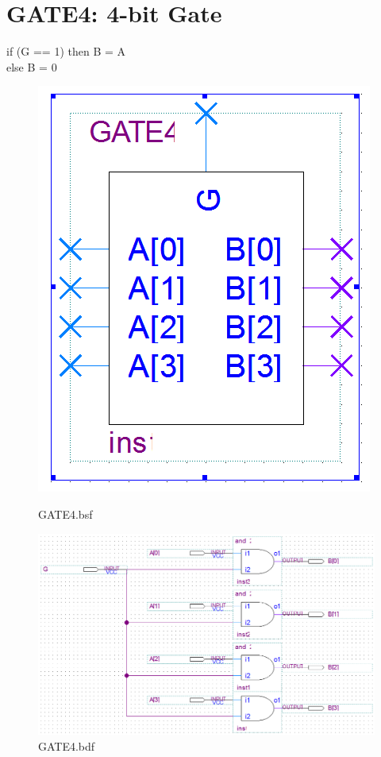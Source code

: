 \documentclass[12pt,a4paper]{article}
\begin{document}
  \section{GATE4: 4-bit Gate}
  if (G == 1) then B = A\\
  else B = 0
  \begin{figure}[H]
    \centering
    \begin{subcaptionblock}{0.15\linewidth}
        \includegraphics[width=\linewidth]{GATE4_bsf.png}
        \caption{GATE4.bsf}
    \end{subcaptionblock}
    \begin{subcaptionblock}{0.84\linewidth}
        \includegraphics[width=\linewidth]{GATE4_bdf.png}
        \caption{GATE4.bdf}
    \end{subcaptionblock}
  \end{figure}
\end{document}
